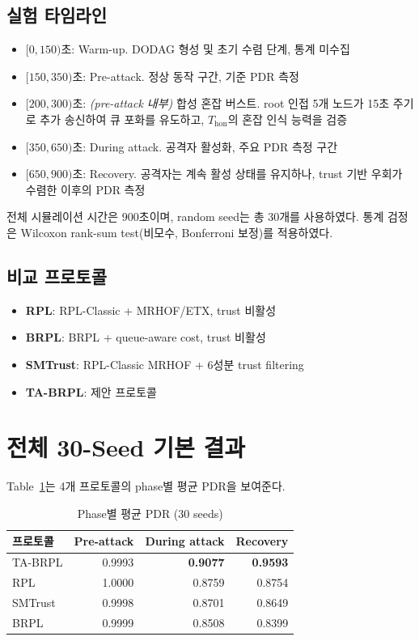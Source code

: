 \documentclass[12pt,a4paper]{article}
\begin{document}
\subsection{실험 타임라인}

\begin{itemize}
  \item $[0,150)$초: Warm-up. DODAG 형성 및 초기 수렴 단계, 통계 미수집
  \item $[150,350)$초: Pre-attack. 정상 동작 구간, 기준 PDR 측정
  \item $[200,300)$초: \textit{(pre-attack 내부)} 합성 혼잡 버스트.
  root 인접 5개 노드가 15초 주기로 추가 송신하여 큐 포화를 유도하고,
  $T_\text{hon}$의 혼잡 인식 능력을 검증
  \item $[350,650)$초: During attack. 공격자 활성화, 주요 PDR 측정 구간
  \item $[650,900)$초: Recovery. 공격자는 계속 활성 상태를 유지하나,
  trust 기반 우회가 수렴한 이후의 PDR 측정
\end{itemize}

전체 시뮬레이션 시간은 900초이며, random seed는 총 30개를 사용하였다.
통계 검정은 Wilcoxon rank-sum test(비모수, Bonferroni 보정)를 적용하였다.

\subsection{비교 프로토콜}

\begin{itemize}
  \item \textbf{RPL}: RPL-Classic + MRHOF/ETX, trust 비활성
  \item \textbf{BRPL}: BRPL + queue-aware cost, trust 비활성
  \item \textbf{SMTrust}: RPL-Classic MRHOF + 6성분 trust filtering
  \item \textbf{TA-BRPL}: 제안 프로토콜
\end{itemize}

\section{전체 30-Seed 기본 결과}
\label{sec:main}

Table~\ref{tab:main_pdr}는 4개 프로토콜의 phase별 평균 PDR을 보여준다.

\begin{table}[t]
  \centering
  \caption{Phase별 평균 PDR (30 seeds)}
  \label{tab:main_pdr}
  \begin{tabular}{lrrr}
    \toprule
    프로토콜 & Pre-attack & During attack & Recovery \\
    \midrule
    TA-BRPL  & 0.9993 & \textbf{0.9077} & \textbf{0.9593} \\
    RPL      & 1.0000 & 0.8759 & 0.8754 \\
    SMTrust  & 0.9998 & 0.8701 & 0.8649 \\
    BRPL     & 0.9999 & 0.8508 & 0.8399 \\
    \bottomrule
  \end{tabular}
\end{table}
\end{document}
